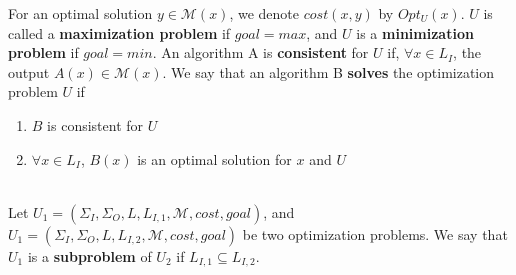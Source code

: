 \begin{tabu}
{   For an optimal solution $y \in \mathcal{M}(x)$, we denote $cost(x,y)$ by
   $Opt_U(x)$. $U$ is called a {\bf maximization problem} if $goal = max$,
   and $U$ is a {\bf minimization problem} if $goal = min$. \newline
   An algorithm A is {\bf consistent} for $U$ if, $\forall x \in L_I$, the
   output $A(x) \in \mathcal{M}(x)$. We say that an algorithm B {\bf solves} the
   optimization problem $U$ if
   \begin{enumerate} \itemsep1pt \parskip0pt  \vspace{-\medskipamount}
   \item $B$ is consistent for $U$
   \item $\forall x \in L_I$, $B(x)$ is an optimal solution for $x$ and $U$
   \vspace{-\medskipamount} \end{enumerate}} \\ \hline
 {Let $U_1 = (\Sigma_I, \Sigma_O, L, L_{I,1}, \mathcal{M}, cost,
 goal)$, and $ U_1 = (\Sigma_I, \Sigma_O, L, L_{I,2}, \mathcal{M}, cost, goal)$
 be two optimization problems. We say that $U_1$ is a {\bf subproblem} of $U_2$
 if $L_{I,1} \subseteq L_{I,2}$.}
\end{tabu}
